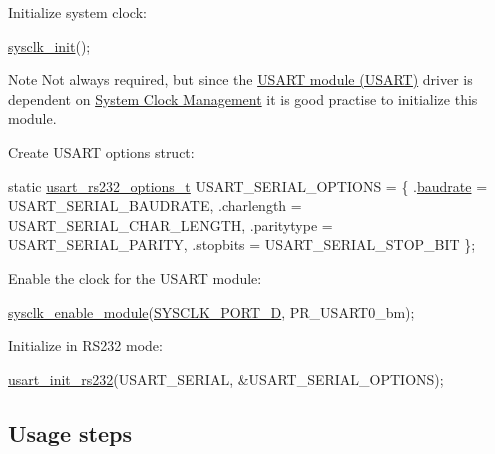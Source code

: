 \begin{DoxyEnumerate}
\item Initialize system clock\-:
\begin{DoxyItemize}
\item 
\begin{DoxyCode}
 \hyperlink{group__sysclk__group_ga242399e48a97739c88b4d0c00f6101de}{sysclk\_init}(); 
\end{DoxyCode}

\item \begin{DoxyNote}{Note}
Not always required, but since the \hyperlink{group__usart__group}{U\-S\-A\-R\-T module (U\-S\-A\-R\-T)} driver is dependent on \hyperlink{group__sysclk__group}{System Clock Management} it is good practise to initialize this module.
\end{DoxyNote}

\end{DoxyItemize}
\item Create U\-S\-A\-R\-T options struct\-:
\begin{DoxyItemize}
\item 
\begin{DoxyCode}
        \textcolor{keyword}{static} \hyperlink{structusart__rs232__options}{usart\_rs232\_options\_t} USART\_SERIAL\_OPTIONS 
      = \{
           .\hyperlink{structusart__rs232__options_a2c48c35d680d4805d357677d7d352fd0}{baudrate} = USART\_SERIAL\_BAUDRATE,
           .charlength = USART\_SERIAL\_CHAR\_LENGTH,
           .paritytype = USART\_SERIAL\_PARITY,
           .stopbits = USART\_SERIAL\_STOP\_BIT
        \};
\end{DoxyCode}

\end{DoxyItemize}
\item Enable the clock for the U\-S\-A\-R\-T module\-:
\begin{DoxyItemize}
\item 
\begin{DoxyCode}
 \hyperlink{group__sysclk__group_gac31edbbb1296f1eb737401b7b2b4e352}{sysclk\_enable\_module}(\hyperlink{group__sysclk__group_gga8e29b46d7670875f4c509efd7a8d5f1aa953a41943eb2d157ee9edcfcd431ce46}{SYSCLK\_PORT\_D}, 
      PR\_USART0\_bm); 
\end{DoxyCode}

\end{DoxyItemize}
\item Initialize in R\-S232 mode\-:
\begin{DoxyItemize}
\item 
\begin{DoxyCode}
 \hyperlink{group__usart__group_ga507caac3c2c003461cd6ded584af984d}{usart\_init\_rs232}(USART\_SERIAL, &USART\_SERIAL\_OPTIONS);
\end{DoxyCode}

\end{DoxyItemize}
\end{DoxyEnumerate}\hypertarget{usart_use_case_1_usart_use_case_1_usage}{}\subsection{Usage steps}\label{usart_use_case_1_usart_use_case_1_usage}
